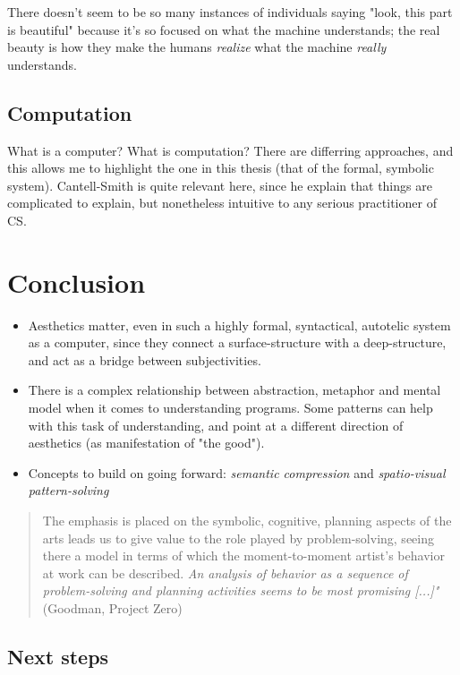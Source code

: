 \documentclass{article}
\begin{document}
There doesn't seem to be so many instances of individuals saying "look, this part is beautiful" because it's so focused on what the machine understands; the real beauty is how they make the humans \emph{realize} what the machine \emph{really} understands.

\subsection{Computation}

What is a computer? What is computation? There are differring approaches, and this allows me to highlight the one in this thesis (that of the formal, symbolic system). Cantell-Smith is quite relevant here, since he explain that things are complicated to explain, but nonetheless intuitive to any serious practitioner of CS.

\section{Conclusion}

\begin{itemize}
  \item Aesthetics matter, even in such a highly formal, syntactical, autotelic system as a computer, since they connect a surface-structure with a deep-structure, and act as a bridge between subjectivities.
  \item There is a complex relationship between abstraction, metaphor and mental model when it comes to understanding programs. Some patterns can help with this task of understanding, and point at a different direction of aesthetics (as manifestation of "the good").
  \item Concepts to build on going forward: \emph{semantic compression} and \emph{spatio-visual pattern-solving}
\end{itemize}

\begin{quote}
    The emphasis is placed on the symbolic, cognitive, planning aspects of the arts leads us to give value to the role played by problem-solving, seeing there a model in terms of which the moment-to-moment artist’s behavior at work can be described. \emph{An analysis of behavior as a sequence of problem-solving and planning activities seems to be most promising [...]"} (Goodman, Project Zero)
\end{quote}

\subsection{Next steps}
\end{document}
